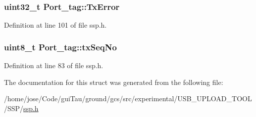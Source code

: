 \hypertarget{struct_port__tag_a99fba539f62c058a3625d7837ada4d85}{
\subsubsection[{Tx\-Error}]{\setlength{\rightskip}{0pt plus 5cm}uint32\-\_\-t Port\-\_\-tag\-::\-Tx\-Error}}\label{struct_port__tag_a99fba539f62c058a3625d7837ada4d85}


Definition at line 101 of file ssp.\-h.

\hypertarget{struct_port__tag_af9374ecad6056fa238ffb54dacd953f0}{
\subsubsection[{tx\-Seq\-No}]{\setlength{\rightskip}{0pt plus 5cm}uint8\-\_\-t Port\-\_\-tag\-::tx\-Seq\-No}}\label{struct_port__tag_af9374ecad6056fa238ffb54dacd953f0}


Definition at line 83 of file ssp.\-h.



The documentation for this struct was generated from the following file\-:\begin{DoxyCompactItemize}
\item 
/home/jose/\-Code/gui\-Tau/ground/gcs/src/experimental/\-U\-S\-B\-\_\-\-U\-P\-L\-O\-A\-D\-\_\-\-T\-O\-O\-L/\-S\-S\-P/\hyperlink{ssp_8h}{ssp.\-h}\end{DoxyCompactItemize}
